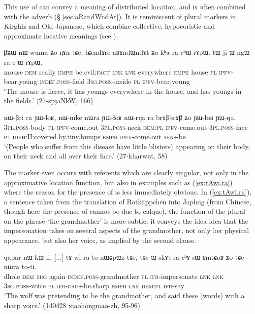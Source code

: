 This use of  can convey a meaning of distributed location, and is often combined with the adverb  (§ \ref{sec:aRandWndAt}). It is reminiscent of plural markers in Kirghiz and Old Japanese, which combine collective, hypocoristic and approximate locative meanings (see \citealt[195]{antonov07ra}).

\begin{exe}
\ex \label{ex:kha.ra}
\gll βʑɯ nɯ wuma ʑo ŋɤn tɕe, tɕendɤre aʁɤndɯndɤt ʑo kʰa ra cʰɯ-rɤpɯ. tɯ-ji ɯ-ngɯ ra cʰɯ-rɤpɯ, \\
mouse \textsc{dem} really \textsc{emph} be.evil:\textsc{fact} \textsc{lnk} \textsc{lnk} everywhere \textsc{emph} house \textsc{pl} \textsc{ipfv}-bear.young \textsc{indef}.\textsc{poss}-field \textsc{3sg}.\textsc{poss}-inside \textsc{pl}  \textsc{ipfv}-bear.young \\
\glt `The mouse is fierce, it has youngs everywhere in the house, and has youngs in the fields.' (27-spjaNkW, 166)
\end{exe} 

\begin{exe}
\ex \label{ex:nWrNa.ra}
\gll nɯ-βri ra ɲɯ-ɬoʁ, nɯ-mke nɯra ɲɯ-ɬoʁ nɯ-rŋa ra brɤβbrɤβ ʑo ɲɯ-ɬoʁ ɲɯ-ŋu. \\
\textsc{3pl}.\textsc{poss}-body \textsc{pl} \textsc{ipfv}-come.out \textsc{3pl}.\textsc{poss}-neck \textsc{dem:pl} \textsc{ipfv}-come.out \textsc{3pl}.\textsc{poss}-face \textsc{pl} \textsc{idph}:II:covered.by.tiny.bumps \textsc{emph} \textsc{ipfv}-come.out  \textsc{sens}-be \\
\glt `(People who suffer from this disease have little blisters) appearing on their body, on their neck and all over their face.' (27-kharwut, 58)
\end{exe} 

The marker  even occurs with referents which are clearly singular, not only in the approximative location function, but also in examples such as (\ref{ex:tAwi.ra}) where the reason for the presence of  is less immediately obvious. In (\ref{ex:tAwi.ra}), a sentence taken from the translation of Rotkäppchen into Japhug (from Chinese, though here the presence of  cannot be due to calque), the function of the plural on the phrase  `the grandmother' is more subtle: it conveys the idea idea that the impersonation takes on several aspects of the grandmother, not only her physical appearance, but also her voice, as implied by the second clause. 

\begin{exe}
\ex \label{ex:tAwi.ra}
\gll  qapar nɯ kɯ li, [...] tɤ-wi ra to-nɯɕpɯz tɕe, tɕe ɯ-skɤt ra cʰɤ-sɯ-ɤmtɕoʁ ʑo tɕe nɯra to-ti. \\
dhole \textsc{dem} \textsc{erg} again { } \textsc{indef}.\textsc{poss}-grandmother \textsc{pl} \textsc{ifr}-impersonate \textsc{lnk} \textsc{lnk} \textsc{3sg}.\textsc{poss}-voice \textsc{pl} \textsc{ifr}-\textsc{caus}-be.sharp \textsc{emph} \textsc{lnk} \textsc{dem}:\textsc{pl} \textsc{ifr}-say \\
\glt `The wolf was pretending to be the grandmother, and said these (words) with a sharp voice.' (140428 xiaohongmao-zh, 95-96)
\end{exe} 

